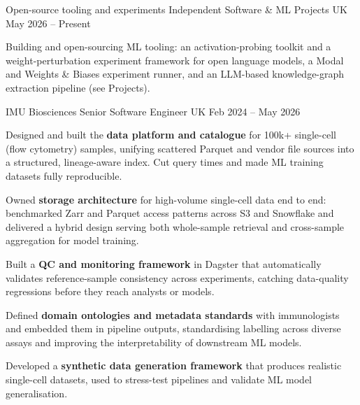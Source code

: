 

\begin{cventries}

  \cventry
    {Open-source tooling and experiments}
    {Independent Software \& ML Projects}
    {UK} %
    {May 2026 -- Present} %
    {
      \begin{cvitems}
        \item {Building and open-sourcing ML tooling: an activation-probing toolkit and a weight-perturbation experiment framework for open language models, a Modal and Weights \& Biases experiment runner, and an LLM-based knowledge-graph extraction pipeline (see Projects).}
      \end{cvitems}
    }

  \cventry
    {IMU Biosciences}
    {Senior Software Engineer}
    {UK} %
    {Feb 2024 -- May 2026} %
    {
    \begin{cvitems}
        \item {Designed and built the \textbf{data platform and catalogue} for 100k+ single-cell (flow cytometry) samples, unifying scattered Parquet and vendor file sources into a structured, lineage-aware index. Cut query times and made ML training datasets fully reproducible.}
        \item {Owned \textbf{storage architecture} for high-volume single-cell data end to end: benchmarked Zarr and Parquet access patterns across S3 and Snowflake and delivered a hybrid design serving both whole-sample retrieval and cross-sample aggregation for model training.}
        \item {Built a \textbf{QC and monitoring framework} in Dagster that automatically validates reference-sample consistency across experiments, catching data-quality regressions before they reach analysts or models.}
        \item {Defined \textbf{domain ontologies and metadata standards} with immunologists and embedded them in pipeline outputs, standardising labelling across diverse assays and improving the interpretability of downstream ML models.}
        \item {Developed a \textbf{synthetic data generation framework} that produces realistic single-cell datasets, used to stress-test pipelines and validate ML model generalisation.}
    \end{cvitems}
    }


\end{cventries}

